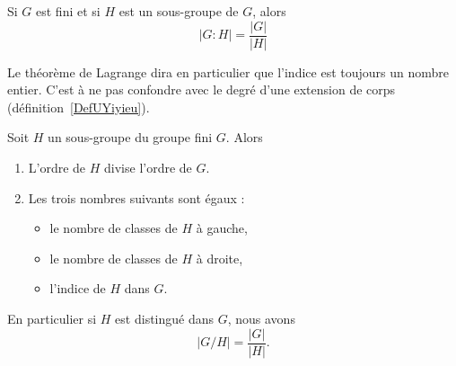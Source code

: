 \begin{proposition}	\label{PROPooKVYZooPvIhic}
	Si \( G\) est fini et si \( H\) est un sous-groupe de \( G\), alors
	\begin{equation}
		| G:H |=\frac{ | G | }{ | H | }
	\end{equation}
\end{proposition}


Le théorème de Lagrange dira en particulier que l'indice est toujours un nombre entier. C'est à ne pas confondre avec le degré d'une extension de corps (définition~\ref{DefUYiyieu}).


\begin{theorem}   \label{ThoLagrange}
	Soit \( H\) un sous-groupe du groupe fini \( G\).  Alors
	\begin{enumerate}
		\item   \label{ITEMooDPKSooNpOusd}
		      L'ordre de \( H\) divise l'ordre de \( G\).
		\item
		      Les trois nombres suivants sont égaux :
		      \begin{itemize}
			      \item
			            le nombre de classes de \( H\) à gauche,
			      \item
			            le nombre de classes de \( H\) à droite,
			      \item
			            l'indice de \( H\) dans \( G\).
		      \end{itemize}
	\end{enumerate}
	En particulier si \( H\) est distingué dans \( G\), nous avons
	\begin{equation}
		| G/H |=\frac{ | G | }{ | H | }.
	\end{equation}
\end{theorem}


